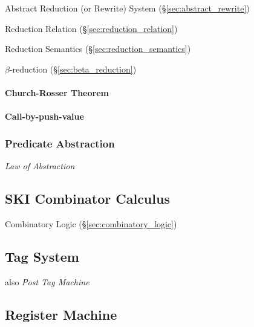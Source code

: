 Abstract Reduction (or Rewrite) System (\S\ref{sec:abstract_rewrite})

Reduction Relation (\S\ref{sec:reduction_relation})

Reduction Semantics (\S\ref{sec:reduction_semantics})

$\beta$-reduction (\S\ref{sec:beta_reduction})



\paragraph{Church-Rosser Theorem}\label{sec:church_rosser}\hfill

\paragraph{Call-by-push-value}\label{sec:call_by_pushvalue}\hfill



\subsubsection{Predicate Abstraction}\label{sec:predicate_abstraction}

\emph{Law of Abstraction}



\subsection{SKI Combinator Calculus}\label{sec:ski_calculus}

Combinatory Logic (\S\ref{sec:combinatory_logic})



\subsection{Tag System}\label{sec:tag_system}

also \emph{Post Tag Machine}



\subsection{Register Machine}\label{sec:register_machine}

